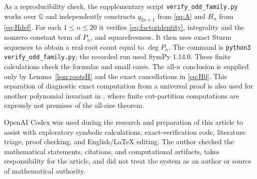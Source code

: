 \documentclass[11pt]{article}
\newcommand{\Q}{\mathbb Q}
\begin{document}
As a reproducibility check, the supplementary script
\texttt{verify\_odd\_family.py} works over $\Q$ and independently constructs
$q_{2n+1}$ from \eqref{eq:A} and $H_n$ from \eqref{eq:Hdef}.  For each
$1\leq n\leq20$ it verifies \eqref{eq:factoridentity}, integrality and the
nonzero constant term of $P_n$, and squarefreeness.  It then uses exact Sturm
sequences to obtain a real-root count equal to $\deg P_n$.  The command is
\texttt{python3 verify\_odd\_family.py}; the recorded run used SymPy 1.14.0.
These finite calculations check the formulas and small cases.  The
all-$n$ conclusion is supplied only by Lemma~\ref{lem:rootsH} and the exact
cancellations in \eqref{eq:H0}.  This separation of diagnostic exact
computation from a universal proof is also used for another polynomial
invariant in \cite{Zeng2026MultiplicityArxiv}, where finite cut-partition
computations are expressly not premises of the all-size theorem.

OpenAI Codex was used during the research and preparation of this article to
assist with exploratory symbolic calculations, exact-verification code,
literature triage, proof checking, and English/\LaTeX{} editing.  The author
checked the mathematical statements, citations, and computational artifacts,
takes responsibility for the article, and did not treat the system as an
author or source of mathematical authority.



\end{document}
